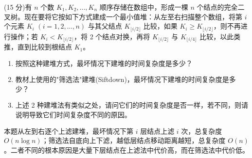 \begin{question}
(15 分)有 $n$ 个数 $K_1, K_2, \dots, K_n$ 顺序存储在数组中，形成一棵 $n$ 个结点的完全二叉树。现在要将它按如下方式建成一个最小值堆：从左至右扫描整个数组，将第 $i$ 个元素 $K_i$ $(i = 1, 2, \dots, n)$ 与其父结点 $K_{\lfloor i/2 \rfloor}$ 比较，如果 $K_i \ge K_{\lfloor i/2 \rfloor}$，则不再进行操作；若 $K_i < K_{\lfloor i/2 \rfloor}$，将 2 个结点对换，再将 $K_{\lfloor i/2 \rfloor}$ 与 $K_{\lfloor i/4 \rfloor}$ 比较，以此类推，直到比较到根结点 $K_1$。

\begin{enumerate}
  \item[(1)] 按照这种建堆方式，最坏情况下建堆的时间复杂度是多少？
\item[(2)] 教材上使用的"筛选法"建堆(Siftdown)，最坏情况下建堆的时间复杂度是多少？
  \item[(3)] 上述 2 种建堆法有类似之处，请问它们的时间复杂度是否一样，若不同，则请说明导致它们时间复杂度不同的原因。
\end{enumerate}
\begin{solution}
本题从左到右逐个上滤建堆，最坏情况下第 $i$ 层结点上滤 $i$ 次，总复杂度 $O(n\log n)$；筛选法自底向上下滤，越低层结点移动距离越短，总复杂度 $O(n)$。二者不同的根本原因是大量下层结点在上滤法中代价高，而在筛选法中代价低。
\end{solution}
\end{question}

